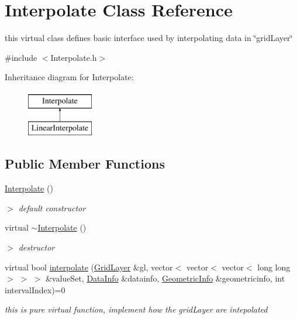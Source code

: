 \hypertarget{classInterpolate}{\section{\-Interpolate \-Class \-Reference}
\label{classInterpolate}
}


this virtual class defines basic interface used by interpolating data in \char`\"{}grid\-Layer\char`\"{}  




{\ttfamily \#include $<$\-Interpolate.\-h$>$}

\-Inheritance diagram for \-Interpolate\-:\begin{figure}[H]
\begin{center}
\leavevmode
\includegraphics[height=2.000000cm]{classInterpolate}
\end{center}
\end{figure}
\subsection*{\-Public \-Member \-Functions}
\begin{DoxyCompactItemize}
\item 
\hypertarget{classInterpolate_a4525154d6de167606c69399e112a113a}{\hyperlink{classInterpolate_a4525154d6de167606c69399e112a113a}{\-Interpolate} ()}\label{classInterpolate_a4525154d6de167606c69399e112a113a}

\begin{DoxyCompactList}\small\item\em $>$ default constructor \end{DoxyCompactList}\item 
\hypertarget{classInterpolate_ae68a7e6180f1a62209d6947e2d864057}{virtual \hyperlink{classInterpolate_ae68a7e6180f1a62209d6947e2d864057}{$\sim$\-Interpolate} ()}\label{classInterpolate_ae68a7e6180f1a62209d6947e2d864057}

\begin{DoxyCompactList}\small\item\em $>$ destructor \end{DoxyCompactList}\item 
virtual bool \hyperlink{classInterpolate_af899b3717d017a8e2054e411f5f780a9}{interpolate} (\hyperlink{classGridLayer}{\-Grid\-Layer} \&gl, vector$<$ vector$<$ vector$<$ long long $>$ $>$ $>$ \&value\-Set, \hyperlink{structDataInfo}{\-Data\-Info} \&datainfo, \hyperlink{structGeometricInfo}{\-Geometric\-Info} \&geometricinfo, int interval\-Index)=0
\begin{DoxyCompactList}\small\item\em this is pure virtual function, implement how the grid\-Layer are intepolated \end{DoxyCompactList}\end{DoxyCompactItemize}


